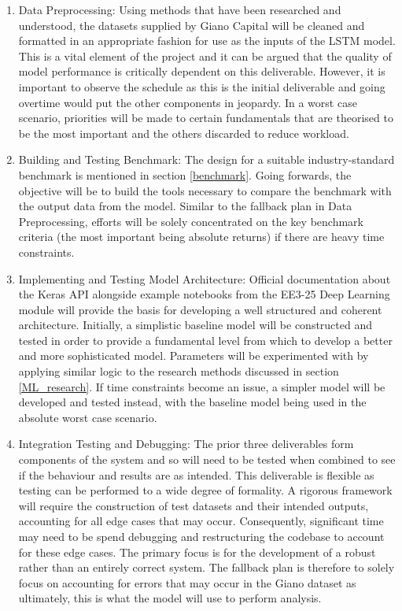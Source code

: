\documentclass[10pt,onecolumn,letterpaper]{article}
\begin{document}
\begin{enumerate}
	\item Data Preprocessing: Using methods that have been researched and understood, the datasets supplied by Giano Capital will be cleaned and formatted in an appropriate fashion for use as the inputs of the LSTM model. This is a vital element of the project and it can be argued that the quality of model performance is critically dependent on this deliverable. However, it is important to observe the schedule as this is the initial deliverable and going overtime would put the other components in jeopardy. In a worst case scenario, priorities will be made to certain fundamentals that are theorised to be the most important and the others discarded to reduce workload.
	 \item Building and Testing Benchmark: The design for a suitable industry-standard benchmark is mentioned in section \ref{benchmark}. Going forwards, the objective will be to build the tools necessary to compare the benchmark with the output data from the model. Similar to the fallback plan in Data Preprocessing, efforts will be solely concentrated on the key benchmark criteria (the most important being absolute returns) if there are heavy time constraints. 
	\item Implementing and Testing Model Architecture: Official documentation about the Keras API alongside example notebooks from the EE3-25 Deep Learning module will provide the basis for developing a well structured and coherent architecture. Initially, a simplistic baseline model will be constructed and tested in order to provide a fundamental level from which to develop a better and more sophisticated model. Parameters will be experimented with by applying similar logic to the research methods discussed in section \ref{ML_research}. If time constraints become an issue, a simpler model will be developed and tested instead, with the baseline model being used in the absolute worst case scenario. 
	\item Integration Testing and Debugging: The prior three deliverables form components of the system and so will need to be tested when combined to see if the behaviour and results are as intended. This deliverable is flexible as testing can be performed to a wide degree of formality. A rigorous framework will require the construction of test datasets and their intended outputs, accounting for all edge cases that may occur. Consequently, significant time may need to be spend debugging and restructuring the codebase to account for these edge cases. The primary focus is for the development of a robust rather than an entirely correct system. The fallback plan is therefore to solely focus on accounting for errors that may occur in the Giano dataset as ultimately, this is what the model will use to perform analysis. 

\end{enumerate}
\end{document}
